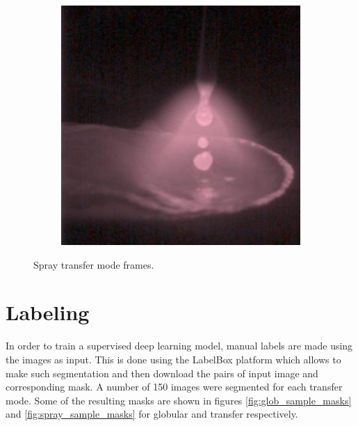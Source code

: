 \begin{figure}[htbp]
\begin{subfigure}[b]{0.3\textwidth}
        \caption{}
    \end{subfigure}
\hfill
    \begin{subfigure}[b]{0.3\textwidth}
        \includegraphics[width=\linewidth]{Images/Dataset/spray_sample_484.jpg}
        \caption{}
    \end{subfigure}

    \caption[Spray transfer mode frames]{Spray transfer mode frames.}
    \label{fig:spray_samples}
\end{figure}

\section{Labeling}
In order to train a supervised deep learning model, manual labels are made using the images as input. This is done using the LabelBox platform which allows to make such segmentation and then download the pairs of input image and corresponding mask. A number of 150 images were segmented for each transfer mode. Some of the resulting masks are shown in figures \ref{fig:glob_sample_masks} and \ref{fig:spray_sample_masks} for globular and transfer respectively.

